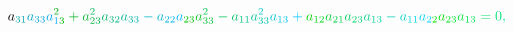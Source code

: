 \documentclass[12pt]{article}
\begin{document}
\begin{displaymath}
{a} _ { \mathcolor[RGB]{0,165,165}{3} \mathcolor[RGB]{0,165,180}{1} } \mathcolor[RGB]{0,165,195}{a} _ { \mathcolor[RGB]{0,165,210}{3} \mathcolor[RGB]{0,165,225}{3} } \mathcolor[RGB]{0,165,240}{a} _ { \mathcolor[RGB]{0,165,255}{1} \mathcolor[RGB]{0,180,0}{3} } ^ { \mathcolor[RGB]{0,180,15}{2} } \mathcolor[RGB]{0,180,30}{+} \mathcolor[RGB]{0,180,45}{a} _ { \mathcolor[RGB]{0,180,60}{2} \mathcolor[RGB]{0,180,75}{3} } ^ { \mathcolor[RGB]{0,180,90}{2} } \mathcolor[RGB]{0,180,105}{a} _ { \mathcolor[RGB]{0,180,120}{3} \mathcolor[RGB]{0,180,135}{2} } \mathcolor[RGB]{0,180,150}{a} _ { \mathcolor[RGB]{0,180,165}{3} \mathcolor[RGB]{0,180,180}{3} } \mathcolor[RGB]{0,180,195}{-} \mathcolor[RGB]{0,180,210}{a} _ { \mathcolor[RGB]{0,180,225}{2} \mathcolor[RGB]{0,180,240}{2} } \mathcolor[RGB]{0,180,255}{a} _ { \mathcolor[RGB]{0,195,0}{2} \mathcolor[RGB]{0,195,15}{3} } \mathcolor[RGB]{0,195,30}{a} _ { \mathcolor[RGB]{0,195,45}{3} \mathcolor[RGB]{0,195,60}{3} } ^ { \mathcolor[RGB]{0,195,75}{2} } \mathcolor[RGB]{0,195,90}{-} \mathcolor[RGB]{0,195,105}{a} _ { \mathcolor[RGB]{0,195,120}{1} \mathcolor[RGB]{0,195,135}{1} } \mathcolor[RGB]{0,195,150}{a} _ { \mathcolor[RGB]{0,195,165}{3} \mathcolor[RGB]{0,195,180}{3} } ^ { \mathcolor[RGB]{0,195,195}{2} } \mathcolor[RGB]{0,195,210}{a} _ { \mathcolor[RGB]{0,195,225}{1} \mathcolor[RGB]{0,195,240}{3} } \mathcolor[RGB]{0,195,255}{+} \mathcolor[RGB]{0,210,0}{a} _ { \mathcolor[RGB]{0,210,15}{1} \mathcolor[RGB]{0,210,30}{2} } \mathcolor[RGB]{0,210,45}{a} _ { \mathcolor[RGB]{0,210,60}{2} \mathcolor[RGB]{0,210,75}{1} } \mathcolor[RGB]{0,210,90}{a} _ { \mathcolor[RGB]{0,210,105}{2} \mathcolor[RGB]{0,210,120}{3} } \mathcolor[RGB]{0,210,135}{a} _ { \mathcolor[RGB]{0,210,150}{1} \mathcolor[RGB]{0,210,165}{3} } \mathcolor[RGB]{0,210,180}{-} \mathcolor[RGB]{0,210,195}{a} _ { \mathcolor[RGB]{0,210,210}{1} \mathcolor[RGB]{0,210,225}{1} } \mathcolor[RGB]{0,210,240}{a} _ { \mathcolor[RGB]{0,210,255}{2} \mathcolor[RGB]{0,225,0}{2} } \mathcolor[RGB]{0,225,15}{a} _ { \mathcolor[RGB]{0,225,30}{2} \mathcolor[RGB]{0,225,45}{3} } \mathcolor[RGB]{0,225,60}{a} _ { \mathcolor[RGB]{0,225,75}{1} \mathcolor[RGB]{0,225,90}{3} } \mathcolor[RGB]{0,225,105}{=} \mathcolor[RGB]{0,225,120}{0} \mathcolor[RGB]{0,225,135}{,} \mathcolor[RGB]{0,225,150}{\,
}
\end{displaymath}
\end{document}
